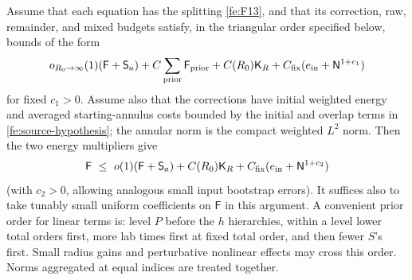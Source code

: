 \begin{proposition}\label{fe:energy-reduction}
Assume that each equation has the splitting \eqref{fe:F13}, and that its correction, raw, remainder, and mixed budgets satisfy, in the triangular order specified below, bounds of the form
\begin{equation}\label{fe:source-hypothesis}
o_{R_0\to\infty}(1)(\mathsf F+\mathsf S_a)
  +C\sum_{\rm prior}\mathsf F_{\rm prior}
  +C(R_0)\mathsf K_R+C_{\rm fix}(e_{\rm in}+\mathsf N^{1+c_1})
\end{equation}
for fixed \(c_1>0\). Assume also that the corrections have initial weighted energy and averaged
starting-annulus costs bounded by the initial and overlap terms in
\eqref{fe:source-hypothesis}; the annular norm is the compact weighted
$L^2$ norm. Then the two energy multipliers give
\begin{equation}\label{fe:far-conclusion}
\mathsf F\ \le\ o(1)(\mathsf F+\mathsf S_a)
          +C(R_0)\mathsf K_R+C_{\rm fix}(e_{\rm in}+\mathsf N^{1+c_2})
\end{equation}
(with \(c_2>0\), allowing analogous small input bootstrap errors). It suffices also to take tunably small uniform coefficients on \(\mathsf F\) in this argument. A convenient prior order for linear terms is: level \(P\) before the \(h\) hierarchies, within a level lower total orders first, more lab times first at fixed total order, and then fewer \(S\)'s first. Small radius gains and perturbative nonlinear effects may cross this order. Norms aggregated at equal indices are treated together.
\end{proposition}

